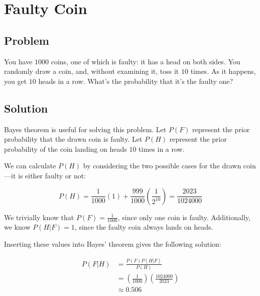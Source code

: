 \documentclass{article}
\date{}
\author{Kaan Aksoy | April 26, 2020}
\title{}
\begin{document}
\maketitle

\section{Faulty Coin}
\subsection{Problem}

You have $1000$ coins, one of which is faulty: it has a head on both sides.
You randomly draw a coin, and, without examining it, toss it $10$ times. As
it happens, you get $10$ heads in a row. What’s the probability that it’s the
faulty one?

\subsection{Solution}

Bayes theorem is useful for solving this problem. Let $P(F)$ represent 
the prior probability that the drawn coin is faulty. Let $P(H)$ represent 
the prior probability of the coin landing on heads $10$ times in a row. 

We can calculate $P(H)$ by considering the two possible cases for the 
drawn coin---it is either faulty or not:

$$P(H) = \frac{1}{1000}(1)+\frac{999}{1000}
\left( \frac{1}{2^{10}} \right) = \frac{2023}{1024000}$$

We trivially know that $P(F) = \frac{1}{1000}$, since only 
one coin is faulty. Additionally, we know $P(H|F) = 1$, since the 
faulty coin always lands on heads.

Inserting these values into Bayes' theorem gives the following solution:

\begin{equation*}
\begin{split}
P(F|H) &= \frac{P(F)P(H|F)}{P(H)} \\
&= \left( \frac{1}{1000}\right) \left(\frac{1024000}{2023} \right) \\
&\approx 0.506
\end{split}
\end{equation*}
\end{document}

